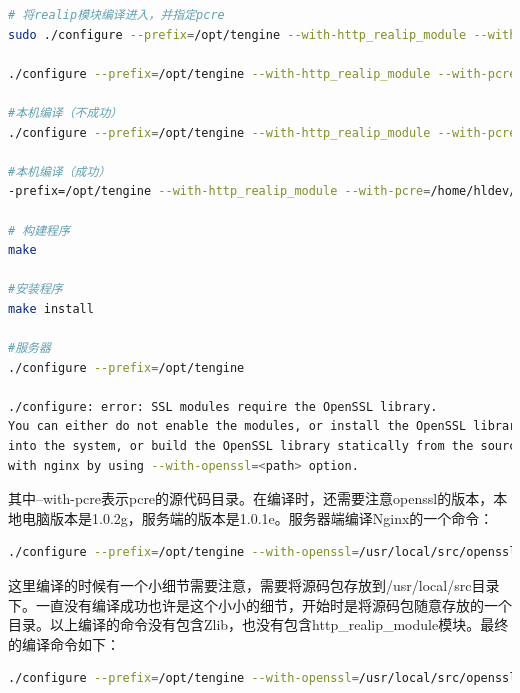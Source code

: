 \documentclass[letter]{book}
\begin{document}
\begin{lstlisting}[language=bash]
# 将realip模块编译进入，并指定pcre
sudo ./configure --prefix=/opt/tengine --with-http_realip_module --with-pcre=/root/software/pcre-8.40 --with-openssl=/root/software/openssl-OpenSSL_1_1_0e --without-http_gzip_module

./configure --prefix=/opt/tengine --with-http_realip_module --with-pcre=/root/software/pcre-8.40  --without-http_gzip_module

#本机编译（不成功）
./configure --prefix=/opt/tengine --with-http_realip_module --with-pcre=/home/hldev/Downloads/pcre-8.40 --with-openssl=/home/hldev/Downloads/openssl-OpenSSL_1_0_1e --without-http_gzip_module

#本机编译（成功）
-prefix=/opt/tengine --with-http_realip_module --with-pcre=/home/hldev/Downloads/pcre-8.40 --with-openssl=/home/hldev/software/openssl-OpenSSL_1_0_2g --without-http_gzip_module

# 构建程序
make

#安装程序
make install

#服务器
./configure --prefix=/opt/tengine

./configure: error: SSL modules require the OpenSSL library.
You can either do not enable the modules, or install the OpenSSL library
into the system, or build the OpenSSL library statically from the source
with nginx by using --with-openssl=<path> option.


\end{lstlisting}

其中--with-pcre表示pcre的源代码目录。在编译时，还需要注意openssl的版本，本地电脑版本是1.0.2g，服务端的版本是1.0.1e。服务器端编译Nginx的一个命令：

\begin{lstlisting}[language=bash]
./configure --prefix=/opt/tengine --with-openssl=/usr/local/src/openssl-OpenSSL_1_0_2g/ --without-http_gzip_module --with-pcre=/usr/local/src/pcre-8.40/
\end{lstlisting}

这里编译的时候有一个小细节需要注意，需要将源码包存放到/usr/local/src目录下。一直没有编译成功也许是这个小小的细节，开始时是将源码包随意存放的一个目录。以上编译的命令没有包含Zlib，也没有包含http\_realip\_module模块。最终的编译命令如下：

\begin{lstlisting}[language=bash]
./configure --prefix=/opt/tengine --with-openssl=/usr/local/src/openssl-OpenSSL_1_0_2g/ --with-pcre=/usr/local/src/pcre-8.40/ --with-zlib=/usr/local/src/zlib-1.2.11 --with-http_realip_module 
\end{lstlisting}
\end{document}
